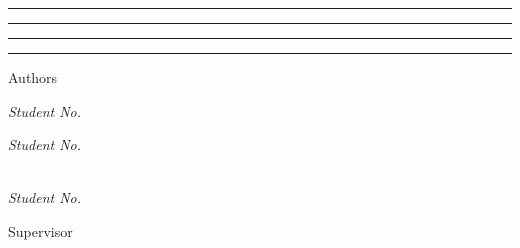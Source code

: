 \begin{titlepage}
    \selectfont %
    \centering\scshape %
	\vspace*{\baselineskip} %

    {\LARGE\textcolor{redreport}{\univname}\par}

    \vspace{2\baselineskip}

    \rule{\textwidth}{1.6pt}\vspace*{-\baselineskip}\vspace*{2pt} 
	\rule{\textwidth}{0.4pt}
	
	\vspace{0.75\baselineskip}

	{\Large\MakeUppercase{\thetitle}\par}
	
	\vspace{0.75\baselineskip}
	
	\rule{\textwidth}{0.4pt}\vspace*{-\baselineskip}\vspace{3.2pt}
	\rule{\textwidth}{1.6pt}

    \vspace{2\baselineskip}

    {\large{\subname}}

    \vspace*{2.5\baselineskip}

    Authors
	
	\vspace{0.5\baselineskip}
	
	{\scshape
        \Large{
            \textcolor{redreport}{\firstauthorname}
            
            \small{\textit{Student No. \firstauthornum}}
            \vspace{0.5\baselineskip}
        }

        \Large{
            \ifdefined\secondauthorname
                \textcolor{redreport}{\secondauthorname}
                
                \small{\textit{Student No. \secondauthornum}}
                \vspace{0.5\baselineskip}
            \fi
        }

        \Large{
            \ifdefined\thirdauthorname
                \textcolor{redreport}{\thirdauthorname} \\
                \vspace{4px}
                \small{\textit{Student No. \thirdauthornum}}
                \vspace{0.5\baselineskip}
            \fi
        } 
    }

    \vspace*{2.5\baselineskip}

    Supervisor
	
	\vspace{0.5\baselineskip}
	
	{\scshape\Large\textcolor{redreport}{\supname}}
	
	\vfill

    {\thedate}
\end{titlepage}
\restoregeometry\blankpage